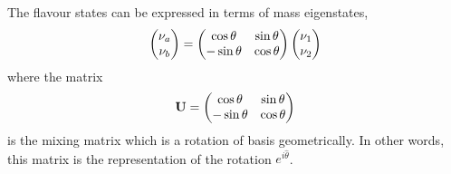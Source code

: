 \documentclass[letterpaper,12pt,english]{sphinxmanual}
\begin{document}
The flavour states can be expressed in terms of mass eigenstates,
\begin{gather}
\begin{split}\begin{pmatrix}\nu_a \\ \nu_b\end{pmatrix} = \begin{pmatrix}  \cos\theta  & \sin\theta \\ -\sin\theta  & \cos\theta \end{pmatrix}   \begin{pmatrix}\nu_1 \\ \nu_2\end{pmatrix}\end{split}\notag
\end{gather}
where the matrix
\begin{gather}
\begin{split}\mathbf U = \begin{pmatrix}  \cos\theta  &  \sin\theta \\ -\sin\theta  & \cos\theta \end{pmatrix}\end{split}\notag
\end{gather}
is the mixing matrix which is a rotation of basis geometrically. In other words, this matrix is the representation of the rotation \(e^{i\hat\theta}\).
\end{document}
